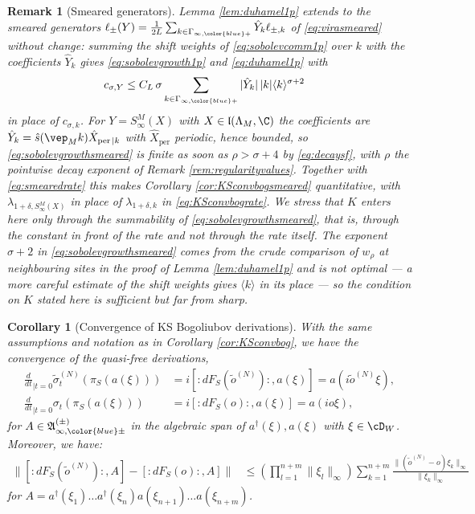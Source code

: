 \documentclass[a4paper, 11pt]{article}
\newcommand{\fA}{\mathfrak{A}}\newcommand{\cA}{\mathcal{A}}\newcommand{\dA}{\mathds{A}}\newcommand{\sA}{\mathscr{A}}
\newcommand{\fl}{\mathfrak{l}}\newcommand{\cl}{\mathcal{l}}
\DeclareMathOperator{\1}{\mathds{1}}
\DeclareMathOperator{\per}{per}
\newtheorem{cor}[thm]{Corollary}
\newtheorem{rem}[thm]{Remark}
\begin{document}
\begin{rem}[Smeared generators]
\label{rem:duhamel1psmeared}
Lemma \ref{lem:duhamel1p} extends to the smeared generators $\ell_{\pm}(Y) = \tfrac{1}{2L}\sum_{k\in\Gamma_{\infty,{\color{blue}+}}}\hat{Y}_{k}\ell_{\pm,k}$ of \eqref{eq:virasmeared} without change: summing the shift weights of \eqref{eq:sobolevcomm1p} over $k$ with the coefficients $\hat{Y}_{k}$ gives \eqref{eq:sobolevgrowth1p} and \eqref{eq:duhamel1p} with
\begin{align}
\label{eq:sobolevgrowthsmeared}
c_{\sigma,Y} & \leq C_{L}\!\ \sigma\sum_{k\in\Gamma_{\infty,{\color{blue}+}}}|\hat{Y}_{k}|\!\ |k|\langle k\rangle^{\sigma+2}
\end{align}
in place of $c_{\sigma,k}$. For $Y = S^{M}_{\infty}(X)$ with $X\in\fl(\Lambda_{M},\C)$ the coefficients are $\hat{Y}_{k} = \hat{s}(\vep_{M}k)\hat{X}_{\per|k}$ with $\hat{X}_{\per}$ periodic, hence bounded, so \eqref{eq:sobolevgrowthsmeared} is finite as soon as $\rho>\sigma+4$ by \eqref{eq:decaysf}, with $\rho$ the pointwise decay exponent of Remark \ref{rem:regularityvalues}. Together with \eqref{eq:smearedrate} this makes Corollary \ref{cor:KSconvbogsmeared} quantitative, with $\lambda_{1+\delta,S^{M}_{\infty}(X)}$ in place of $\lambda_{1+\delta,k}$ in \eqref{eq:KSconvbograte}. We stress that $K$ enters here only through the summability of \eqref{eq:sobolevgrowthsmeared}, that is, through the constant in front of the rate and not through the rate itself. The exponent $\sigma+2$ in \eqref{eq:sobolevgrowthsmeared} comes from the crude comparison of $w_{\rho}$ at neighbouring sites in the proof of Lemma \ref{lem:duhamel1p} and is not optimal --- a more careful estimate of the shift weights gives $\langle k\rangle$ in its place --- so the condition on $K$ stated here is sufficient but far from sharp.
\end{rem}

\begin{cor}[Convergence of KS Bogoliubov derivations]
\label{cor:KSderivationconv}
With the same assumptions and notation as in Corollary \ref{cor:KSconvbog}, we have the convergence of the quasi-free derivations,
\begin{align*}
\tfrac{d}{dt}_{|t=0}\tilde{\sigma}^{(N)}_{t}(\pi_{S}(a(\xi))) & = i[:\!dF_{S}(\tilde{o}^{(N)})\!:,a(\xi)] = a(i\tilde{o}^{(N)}\xi), \\
\tfrac{d}{dt}_{|t=0}\sigma_{t}(\pi_{S}(a(\xi))) & = i[:\!dF_{S}(o)\!:,a(\xi)] = a(io\xi),
\end{align*}
for $A\in\fA^{(\pm)}_{\infty,{\color{blue}\pm}}$ in the algebraic span of $a^{\dag}(\xi), a(\xi)$ with $\xi\in\cD_{W}$. Moreover, we have:
\begin{align}
\label{eq:KSmultiestimatederivation}
\|[:\!dF_{S}(\tilde{o}^{(N)})\!:,A] - [:\!dF_{S}(o)\!:,A]\| & \leq \left(\prod_{l=1}^{n+m}\|\xi_{l}\|_{\infty}\right)\sum_{k=1}^{n+m}\frac{\|(\tilde{o}^{(N)} - o)\xi_{k}\|_{\infty}}{\|\xi_{k}\|_{\infty}}\;
\end{align}
for $A = a^{\dagger}(\xi_{1})\dots a^{\dagger}(\xi_{n})a(\xi_{n+1})\dots a(\xi_{n+m})$.
\end{cor}
\end{document}

